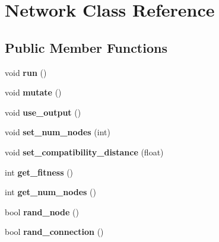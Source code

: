 \hypertarget{classNetwork}{}\section{Network Class Reference}
\label{classNetwork}
\subsection*{Public Member Functions}
\begin{DoxyCompactItemize}
\item 
void {\bfseries run} ()\hypertarget{classNetwork_acc13a2e54ee332bb9f288f953ae141ed}{}\label{classNetwork_acc13a2e54ee332bb9f288f953ae141ed}

\item 
void {\bfseries mutate} ()\hypertarget{classNetwork_aee08409aeb49afa57118ecd46fe78860}{}\label{classNetwork_aee08409aeb49afa57118ecd46fe78860}

\item 
void {\bfseries use\+\_\+output} ()\hypertarget{classNetwork_a7ed4519d18b5a0ef1609c0bcb5293eac}{}\label{classNetwork_a7ed4519d18b5a0ef1609c0bcb5293eac}

\item 
void {\bfseries set\+\_\+num\+\_\+nodes} (int)\hypertarget{classNetwork_aacdf726e8b1612af91eda0dad84dbb1e}{}\label{classNetwork_aacdf726e8b1612af91eda0dad84dbb1e}

\item 
void {\bfseries set\+\_\+compatibility\+\_\+distance} (float)\hypertarget{classNetwork_a05aacf7dc8b0a5f5ad450a8967a23bcd}{}\label{classNetwork_a05aacf7dc8b0a5f5ad450a8967a23bcd}

\item 
int {\bfseries get\+\_\+fitness} ()\hypertarget{classNetwork_a9cbd53529850ef62018244c293ab61b7}{}\label{classNetwork_a9cbd53529850ef62018244c293ab61b7}

\item 
int {\bfseries get\+\_\+num\+\_\+nodes} ()\hypertarget{classNetwork_a2268dae8ee6baf63f311b29a8bafde0c}{}\label{classNetwork_a2268dae8ee6baf63f311b29a8bafde0c}

\item 
bool {\bfseries rand\+\_\+node} ()\hypertarget{classNetwork_a29676c0b42a6123b441e7f1fcba522b4}{}\label{classNetwork_a29676c0b42a6123b441e7f1fcba522b4}

\item 
bool {\bfseries rand\+\_\+connection} ()\hypertarget{classNetwork_a5f85af3cb52fcab5b15b226496686e77}{}\label{classNetwork_a5f85af3cb52fcab5b15b226496686e77}


\end{DoxyCompactItemize}

